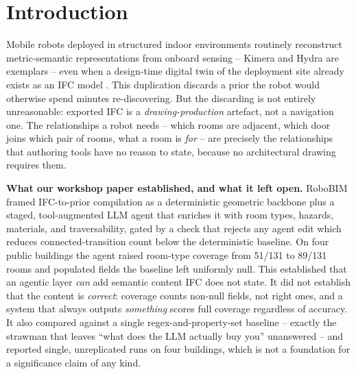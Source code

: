 \documentclass[a4paper, 10pt, conference]{ieeeconf}
\begin{document}
\section{Introduction}

Mobile robots deployed in structured indoor environments routinely reconstruct metric-semantic representations from onboard sensing -- Kimera \cite{rosinol2021kimera} and Hydra \cite{hughes2022hydra} are exemplars -- even when a design-time digital twin of the deployment site already exists as an IFC model \cite{hamieh2021,follini2020,kim2022semantic}. This duplication discards a prior the robot would otherwise spend minutes re-discovering. But the discarding is not entirely unreasonable: exported IFC is a \emph{drawing-production} artefact, not a navigation one. The relationships a robot needs -- which rooms are adjacent, which door joins which pair of rooms, what a room is \emph{for} -- are precisely the relationships that authoring tools have no reason to state, because no architectural drawing requires them.

\textbf{What our workshop paper established, and what it left open.} RoboBIM \cite{nedungadi2026robobimws} framed IFC-to-prior compilation as a deterministic geometric backbone plus a staged, tool-augmented LLM agent that enriches it with room types, hazards, materials, and traversability, gated by a check that rejects any agent edit which reduces connected-transition count below the deterministic baseline. On four public buildings the agent raised room-type coverage from 51/131 to 89/131 rooms and populated fields the baseline left uniformly null. This established that an agentic layer \emph{can} add semantic content IFC does not state. It did not establish that the content is \emph{correct}: coverage counts non-null fields, not right ones, and a system that always outputs \emph{something} scores full coverage regardless of accuracy. It also compared against a single regex-and-property-set baseline -- exactly the strawman that leaves ``what does the LLM actually buy you'' unanswered -- and reported single, unreplicated runs on four buildings, which is not a foundation for a significance claim of any kind.
\end{document}
